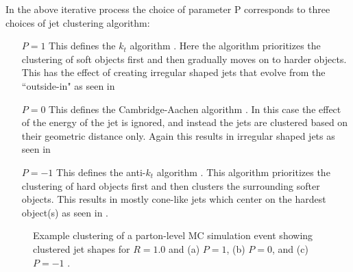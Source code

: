 In the above iterative process the choice of parameter P corresponds to three choices of jet clustering algorithm:

\begin{enumerate}

  \item[$P = 1$] This defines the $k_{t}$ algorithm \cite{Catani:1993hr}.  Here the algorithm prioritizes the clustering of soft objects first and then gradually moves on to harder objects.  This has the effect of creating irregular shaped jets that evolve from the ``outside-in" as seen in 
  \item[$P = 0$] This defines the Cambridge-Aachen algorithm \cite{Dokshitzer:1997in}.  In this case the effect of the energy of the jet is ignored, and instead the jets are clustered based on their geometric distance only.  Again this results in irregular shaped jets as seen in 
  \item[$P = -1$] This defines the anti-$k_{t}$ algorithm \cite{Cacciari:2008gp}.  This algorithm prioritizes the clustering of hard objects first and then clusters the surrounding softer objects.  This results in mostly cone-like jets which center on the hardest object(s) as seen in .
\end{enumerate}

\begin{figure}[!htbp]
  \centering
  \caption{Example clustering of a parton-level MC simulation event showing
clustered jet shapes for $R=1.0$ and (a) $P=1$, (b) $P=0$, and (c) $P=-1$
\cite{Cacciari:2008gp}.}
  \label{fig:clustering_algorithms}
\end{figure}

